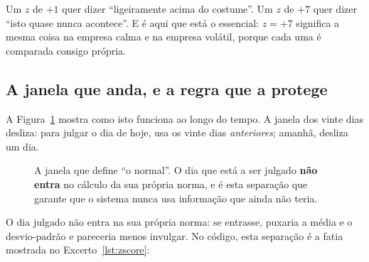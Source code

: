 Um $z$ de $+1$ quer dizer ``ligeiramente acima do costume''. Um $z$ de $+7$ quer dizer ``isto quase
nunca acontece''. E é aqui que está o essencial: $z = +7$ significa a mesma coisa na empresa calma e
na empresa volátil, porque cada uma é comparada consigo própria.

\subsection{A janela que anda, e a regra que a protege}

A Figura~\ref{fig:janela} mostra como isto funciona ao longo do tempo. A janela dos vinte dias
desliza: para julgar o dia de hoje, usa os vinte dias \emph{anteriores}; amanhã, desliza um dia.

\begin{figure}[ht]
\centering
{}
\caption[A janela deslizante do \emph{z}-score]{A janela que define ``o normal''. O dia que está a ser
julgado \textbf{não entra} no cálculo da sua própria norma, e é esta separação que garante que o
sistema nunca usa informação que ainda não teria.}
\label{fig:janela}
\end{figure}

O dia julgado não entra na sua própria norma: se entrasse, puxaria a média e o desvio-padrão e
pareceria menos invulgar. No código, esta separação é a fatia mostrada no
Excerto~\ref{lst:zscore}:

